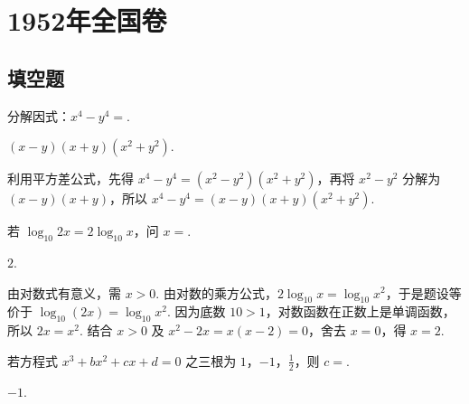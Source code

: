 \documentclass[UTF8,a4paper,oneside,11pt]{ctexbook}
\begin{document}
\mainmatter

\chapter{1952年全国卷}

\section{填空题}


\begin{problem}
分解因式：\(x^{4} - y^{4} =\)\fillinblank{}.
\end{problem}

\begin{answer}
\(\left( x-y \right)\left( x+y \right)\left( x^{2}+y^{2} \right)\).
\end{answer}

\begin{solution}
利用平方差公式，先得 \(x^{4}-y^{4}=\left( x^{2}-y^{2} \right)\left( x^{2}+y^{2} \right)\)，再将 \(x^{2}-y^{2}\) 分解为 \(\left( x-y \right)\left( x+y \right)\)，所以 \(x^{4}-y^{4}=\left( x-y \right)\left( x+y \right)\left( x^{2}+y^{2} \right)\).
\end{solution}

\begin{problem}
若 \(\log_{10} 2x = 2\log_{10} x\)，问 \(x=\)\fillinblank{}.
\end{problem}

\begin{answer}
\(2\).
\end{answer}

\begin{solution}
由对数式有意义，需 \(x>0\). 由对数的乘方公式，\(2\log_{10}x=\log_{10}x^{2}\)，于是题设等价于 \(\log_{10}(2x)=\log_{10}x^{2}\). 因为底数 \(10>1\)，对数函数在正数上是单调函数，所以 \(2x=x^{2}\). 结合 \(x>0\) 及 \(x^{2}-2x=x(x-2)=0\)，舍去 \(x=0\)，得 \(x=2\).
\end{solution}

\begin{problem}
若方程式 \(x^{3} + bx^{2} + cx + d = 0\) 之三根为 \(1\)，\(-1\)，\(\frac{1}{2}\)，则 \(c=\)\fillinblank{}.
\end{problem}

\begin{answer}
\(-1\).
\end{answer}
\end{document}

